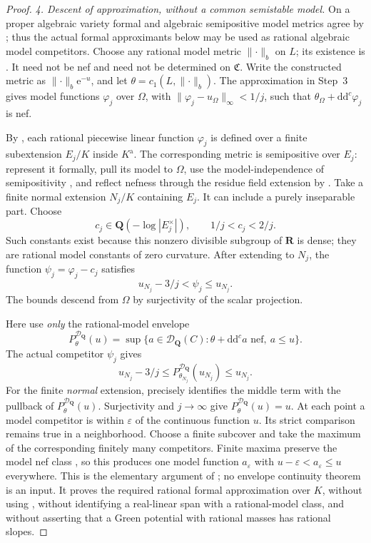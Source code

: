\begin{proof}
\emph{4. Descent of approximation, without a common semistable model.}
On a proper algebraic variety formal and algebraic semipositive model
metrics agree by \cite[Theorem~1.1]{GM19}; thus the actual formal
approximants below may be used as rational algebraic model competitors.
Choose any rational model metric \(\lVert\cdot\rVert_b\) on \(L\);
its existence is \cite[\S2.1 and Proposition~2.10]{GM19}.
It need not be nef and need not be determined on \(\mathfrak C\).
Write the constructed metric as
\(\lVert\cdot\rVert_b\mathrm e^{-u}\), and let
\(\theta=c_1(L,\lVert\cdot\rVert_b)\).
The approximation in Step~3 gives model functions \(\varphi_j\)
over \(\Omega\), with
\(\lVert\varphi_j-u_\Omega\rVert_\infty<1/j\), such that
\(\theta_\Omega+\mathrm d\mathrm d^c\varphi_j\) is nef.

By \cite[Proposition~2.18(b)]{GM19}, each rational piecewise linear
function \(\varphi_j\) is defined over a finite subextension
\(E_j/K\) inside \(K^{\mathrm a}\).  The corresponding metric
is semipositive over \(E_j\): represent it formally, pull its model
to \(\Omega\), use the model-independence of semipositivity
\cite[Proposition~3.5]{GM19}, and reflect nefness through the residue
field extension by \cite[Lemma~3.3]{GM19}.  Take a finite normal
extension \(N_j/K\) containing \(E_j\).  It can include a purely
inseparable part.  Choose
\[
 c_j\in\mathbf Q(-\log|E_j^\times|),\qquad 1/j<c_j<2/j.
\]
Such constants exist because this nonzero divisible subgroup of
\(\mathbf R\) is dense; they are rational model constants of zero
curvature.  After extending to \(N_j\), the function
\(\psi_j=\varphi_j-c_j\) satisfies
\[
       u_{N_j}-3/j<\psi_j\leq u_{N_j}.
\]
The bounds descend from \(\Omega\) by surjectivity of the scalar projection.

Here use \emph{only} the rational-model envelope
\[
 P^{\mathcal D_{\mathbf Q}}_\theta(u)
 =\sup\{a\in\mathcal D_{\mathbf Q}(C):
                 \theta+\mathrm d\mathrm d^ca\text{ nef},\ a\leq u\}.
\]
The actual competitor \(\psi_j\) gives
\[
 u_{N_j}-3/j
 \leq P^{\mathcal D_{\mathbf Q}}_{\theta_{N_j}}(u_{N_j})
 \leq u_{N_j}.
\]
For the finite \emph{normal} extension, precisely
\cite[Proposition~2.11]{GJKM19} identifies the middle term with the
pullback of \(P^{\mathcal D_{\mathbf Q}}_\theta(u)\).  Surjectivity
and \(j\to\infty\) give
\(P^{\mathcal D_{\mathbf Q}}_\theta(u)=u\).
At each point a model competitor is within \(\varepsilon\) of the
continuous function \(u\).  Its strict comparison remains true in
a neighborhood.  Choose a finite subcover and take the maximum of
the corresponding finitely many competitors.  Finite maxima preserve
the model nef class \cite[\S2.5]{GJKM19}, so this produces one model
function \(a_\varepsilon\) with
\(u-\varepsilon<a_\varepsilon\leq u\) everywhere.
This is the elementary argument of
\cite[Proposition~2.9(8)]{GJKM19}; no envelope continuity theorem is
an input.  It proves the required rational formal approximation over
\(K\), without using \cite[Theorem~3.1 or Proposition~3.10]{GJKM19}, without
identifying a real-linear span with a rational-model class, and without
asserting that a Green potential with rational masses has rational slopes.


\end{proof}
